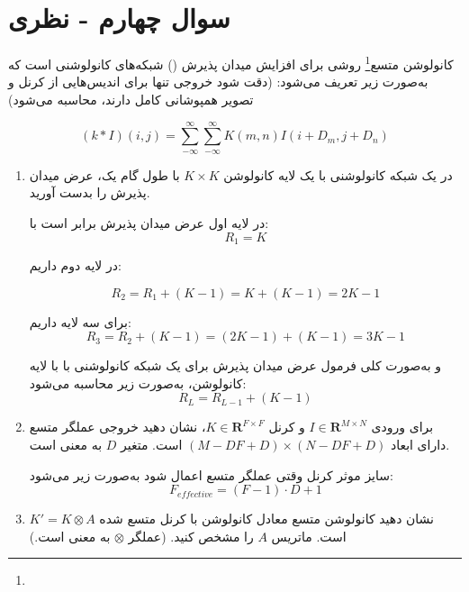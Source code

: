\section{سوال چهارم - نظری}

کانولوشن متسع\footnote{} روشی برای افزایش میدان پذیرش () شبکه‌های کانولوشنی است که به‌صورت زیر تعریف می‌شود: (دقت شود خروجی تنها برای اندیس‌هایی از کرنل و تصویر همپوشانی کامل دارند، محاسبه می‌شود)

$$ (k \ast I)(i, j)=\sum_{-\infty}^{\infty}\sum_{-\infty}^{\infty} K(m,n)I(i+D_m, j+D_n) $$



\begin{enumerate}
	\item در یک شبکه کانولوشنی با یک لایه کانولوشن $K\times K$ با طول گام یک، عرض میدان پذیرش را بدست آورید.
	
	\begin{qsolve}
		
		
		 
		 
		 در لایه اول عرض میدان پذیرش برابر است با:
		 $$ R_1=K $$
		 
		 در لایه دوم داریم:
		 
		 $$ R_2=R_1+(K-1)=K+(K-1)=2K-1 $$
		 
		 برای سه لایه داریم:
		 $$ R_3=R_2+(K-1)=(2K-1)+(K-1)=3K-1$$
		 
		 و به‌صورت کلی فرمول عرض میدان پذیرش برای یک شبکه کانولوشنی با با  لایه کانولوشن، به‌صورت زیر محاسبه می‌شود:
		 $$ R_L=R_{L-1} + (K - 1) $$
	\end{qsolve}
	
	
	
	
	\item برای ورودی 
	$I \in \mathbf{R}^{M\times N}$
	و کرنل
	$K \in \mathbf{R}^{F\times F}$،
		نشان دهید خروجی عملگر متسع دارای ابعاد 
	$(M-DF+D)\times (N-DF+D)$
	است. متغیر $D$ به معنی  است.
	
	
	
	\begin{qsolve}
		سایز موثر کرنل وقتی عملگر متسع اعمال شود به‌صورت زیر می‌شود:
		$$ F_{effective}=(F-1)\cdot D+1 $$
	\end{qsolve}
	
	
	
	
	
	
	
	\item نشان دهید کانولوشن متسع معادل کانولوشن با کرنل متسع شده 
	$K'=K \otimes A$ 
	است. ماتریس $A$ را مشخص کنید. (عملگر $\otimes$ به معنی   است.)
\end{enumerate}

















